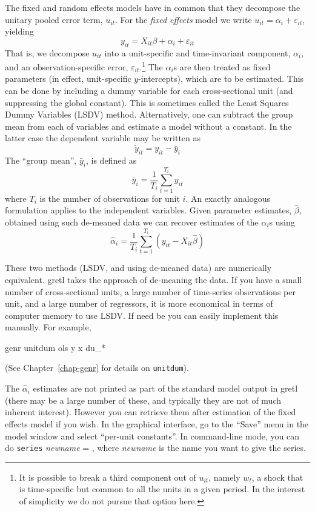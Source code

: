The fixed and random effects models have in common that they decompose
the unitary pooled error term, $u_{it}$.  For the \textsl{fixed effects}
model we write $u_{it} = \alpha_i + \varepsilon_{it}$, yielding
\begin{equation}
\label{eq:FE}
y_{it} = X_{it}\beta + \alpha_i + \varepsilon_{it}
\end{equation}
That is, we decompose $u_{it}$ into a unit-specific and time-invariant
component, $\alpha_i$, and an observation-specific error,
$\varepsilon_{it}$.\footnote{It is possible to break a third component
  out of $u_{it}$, namely $w_t$, a shock that is time-specific but
  common to all the units in a given period.  In the interest of
  simplicity we do not pursue that option here.}  The $\alpha_i$s are
then treated as fixed parameters (in effect, unit-specific
$y$-intercepts), which are to be estimated.  This can be done by
including a dummy variable for each cross-sectional unit (and
suppressing the global constant).  This is sometimes called the Least
Squares Dummy Variables (LSDV) method.  Alternatively, one can subtract
the group mean from each of variables and estimate a model without a
constant.  In the latter case the dependent variable may be written as
\[
\tilde{y}_{it} = y_{it} - \bar{y}_i
\]
The ``group mean'', $\bar{y}_i$, is defined as
\[
\bar{y}_i = \frac{1}{T_i} \sum_{t=1}^{T_i} y_{it}
\]
where $T_i$ is the number of observations for unit $i$.  An exactly
analogous formulation applies to the independent variables.  Given
parameter estimates, $\hat{\beta}$, obtained using such de-meaned data
we can recover estimates of the $\alpha_i$s using
\[
\hat{\alpha}_i = \frac{1}{T_i} \sum_{t=1}^{T_i} 
   \left(y_{it} - X_{it}\hat{\beta}\right)
\]

These two methods (LSDV, and using de-meaned data) are numerically
equivalent. gretl takes the approach of de-meaning the data.  If
you have a small number of cross-sectional units, a large number of
time-series observations per unit, and a large number of regressors,
it is more economical in terms of computer memory to use LSDV.  If 
need be you can easily implement this manually.  For example,
%
\begin{code}
genr unitdum
ols y x du_*
\end{code}
%
(See Chapter~\ref{chap-genr} for details on \texttt{unitdum}).

The $\hat{\alpha}_i$ estimates are not printed as part of the standard
model output in gretl (there may be a large number of these, and
typically they are not of much inherent interest).  However you can
retrieve them after estimation of the fixed effects model if you wish.
In the graphical interface, go to the ``Save'' menu in the model
window and select ``per-unit constants''.  In command-line mode, you
can do \texttt{series} \textsl{newname} = , where
\textsl{newname} is the name you want to give the series.

